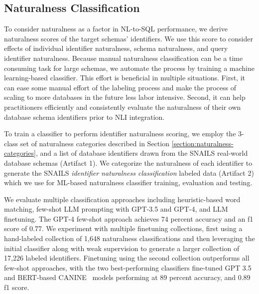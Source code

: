 \subsection{Naturalness Classification}
\label{subsection:naturalness-scoring}




To consider naturalness as a factor in NL-to-SQL performance, we derive naturalness scores of the target schemas' identifiers.
We use this score to consider effects of individual identifier naturalness, schema naturalness, and query identifier naturalness.
Because manual naturalness classification can be a time consuming task for large schemas, we automate the process by training a machine learning-based classifier.
This effort is beneficial in multiple situations.
First, it can ease some manual effort of the labeling process and make the process of scaling to more databases in the future less labor intensive.
Second, it can help practitioners efficiently and consistently evaluate the naturalness of their own database schema identifiers prior to NLI integration.


To train a classifier to perform identifier naturalness scoring, we employ the 3-class set of naturalness categories described in Section \ref{section:naturalness-categories}, and a list of database identifiers drawn from the SNAILS real-world database schemas (Artifact 1).
We categorize the naturalness of each identifier to generate the SNAILS \emph{identifier naturalness classification} labeled data (Artifact 2) which we use for ML-based naturalness classifier training, evaluation and testing.

We evaluate multiple classification approaches including heuristic-based word matching, few-shot LLM prompting with GPT-3.5 and GPT-4, and LLM finetuning.
The GPT-4 few-shot approach achieves 74 percent accuracy and an f1 score of 0.77.
We experiment with multiple finetuning collections, first using a hand-labeled collection of 1,648 naturalness classifications and then leveraging the initial classifier along with weak supervision to generate a larger collection of 17,226 labeled identifiers.
Finetuning using the second collection outperforms all few-shot approaches, with the
two best-performing classifiers fine-tuned GPT 3.5 and BERT-based CANINE~\cite{Clark-2022} models performing at 89 percent accuracy, and 0.89 f1 score.

